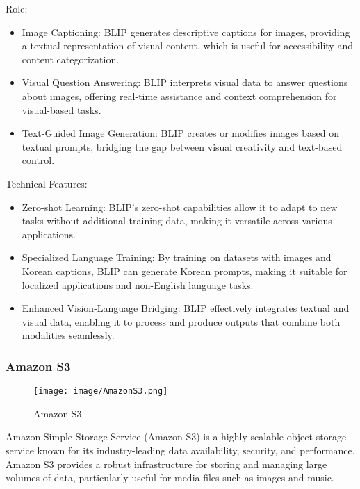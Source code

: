 \documentclass[conference]{IEEEtran}
\begin{document}
Role: 
\begin{itemize}
    \item Image Captioning: BLIP generates descriptive captions for images, providing a textual representation of visual content, which is useful for accessibility and content categorization.\\
    \item Visual Question Answering: BLIP interprets visual data to answer questions about images, offering real-time assistance and context comprehension for visual-based tasks.\\
    \item Text-Guided Image Generation: BLIP creates or modifies images based on textual prompts, bridging the gap between visual creativity and text-based control.\\
\end{itemize}

Technical Features:
\begin{itemize}
    \item Zero-shot Learning: BLIP’s zero-shot capabilities allow it to adapt to new tasks without additional training data, making it versatile across various applications.\\
    \item Specialized Language Training: By training on datasets with images and Korean captions, BLIP can generate Korean prompts, making it suitable for localized applications and non-English language tasks.\\
    \item Enhanced Vision-Language Bridging: BLIP effectively integrates textual and visual data, enabling it to process and produce outputs that combine both modalities seamlessly.\\
\end{itemize}

\subsubsection{Amazon S3}

\begin{figure}[h!]
    \centering
    \texttt{[image: image/AmazonS3.png]}
    \caption{Amazon S3}
    \label{fig:enter-label}
\end{figure}

\noindent Amazon Simple Storage Service (Amazon S3) is a highly scalable object storage service known for its industry-leading data availability, security, and performance. Amazon S3 provides a robust infrastructure for storing and managing large volumes of data, particularly useful for media files such as images and music.\\
\end{document}
